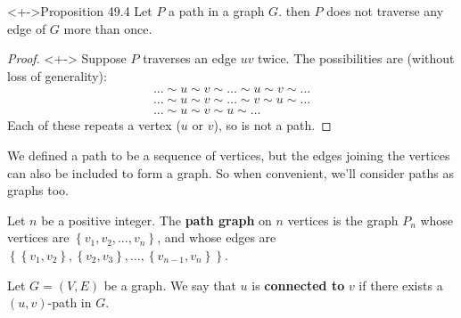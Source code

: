 \documentclass[ignorenonframetext,aspectratio=169]{beamer}
\let\defined\textbf
\providecommand{\set}[1]{\left\{#1\right\}}
\begin{document}
\begin{frame}[label=path-prop]
\begin{block}<+->{Proposition 49.4}
    Let $P$ a path in a graph $G$.  then $P$ does not traverse any edge of $G$ more than once.
\end{block}
\begin{proof}<+->
Suppose $P$ traverses an edge $uv$ twice.  The possibilities are (without loss of generality):
\begin{gather*}
 \dots \sim u \sim v \sim \dots \sim u \sim v \sim \dots \\
\dots \sim u \sim v \sim \dots \sim v \sim u \sim \dots \\
\dots \sim u \sim v \sim u \sim \dots
\end{gather*}
Each of these repeats a vertex ($u$ or $v$), so is not a path.
\end{proof}
\end{frame}

\begin{frame}[label=path-graph-def]
We defined a path to be a sequence of vertices, but the edges joining the vertices
can also be included to form a graph.  So when convenient, we'll consider paths as graphs too.
\begin{definition}
    Let $n$ be a positive integer.
    The \defined{path graph} on $n$ vertices is the graph $P_n$ whose vertices
    are $\set{v_1,v_2,\dots,v_n}$, and whose edges are
    $\set{\set{v_1,v_2},\set{v_2,v_3},\dots,\set{v_{n-1},v_n}}$.
\end{definition}
\end{frame}

\begin{frame}[label=ctdto-def]
\begin{definition}[Connected to]
    Let $G=(V,E)$ be a graph.
    We say that $u$ is \defined{connected to} $v$ if there exists a $(u,v)$-path in $G$.
\end{definition}
\end{frame}
\end{document}
